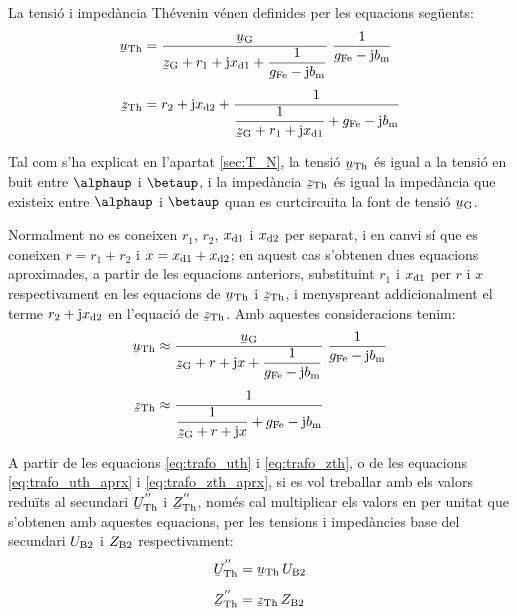 La tensió i impedància Thévenin vénen definides per les equacions
següents:
\begin{align}
    \cmplx{u}\ped{Th} &= \frac{\cmplx{u}\ped{G}}{\cmplx{z}\ped{G} + r_1 + \ju
    x\ped{d1} + \dfrac{1}{g\ped{Fe}-\ju b\ped{m}}} \;\frac{1}{g\ped{Fe}-\ju
    b\ped{m}} \label{eq:trafo_uth}\\[1ex]
    \cmplx{z}\ped{Th} &= r_2 + \ju x\ped{d2} + \frac{1}{\dfrac{1}{\cmplx{z}\ped{G} + r_1 +
    \ju x\ped{d1}} + g\ped{Fe}-\ju b\ped{m}}\label{eq:trafo_zth}
\end{align}

Tal com s'ha explicat en l'apartat \vref{sec:T_N}, la tensió
$\cmplx{u}\ped{Th}$ és igual a la tensió en buit entre $\alphaup$ i
$\betaup$, i la impedància $\cmplx{z}\ped{Th}$ és igual la impedància
que existeix entre $\alphaup$ i $\betaup$ quan es curtcircuita la font
de tensió $\cmplx{u}\ped{G}$.

Normalment no es coneixen $r_1$, $r_2$, $x_\mathrm{d1}$ i $x_\mathrm{d2}$ per separat, i
en canvi sí que es coneixen $r=r_1+r_2$ i $x=x_\mathrm{d1}+x_\mathrm{d2}$; en aquest
cas s'obtenen dues equacions aproximades, a partir de les equacions
anteriors, substituint $r_1$ i $x_\mathrm{d1}$ per $r$ i $x$ respectivament en
les equacions de $\cmplx{u}\ped{Th}$ i $\cmplx{z}\ped{Th}$, i
menyspreant addicionalment el terme $r_2 + \mathrm{j} x_\mathrm{d2}$ en l'equació
de $\cmplx{z}\ped{Th}$. Amb aquestes consideracions tenim:
\begin{align}
    \cmplx{u}\ped{Th} &\approx \frac{\cmplx{u}\ped{G}}{\cmplx{z}\ped{G} + r + \ju
    x + \dfrac{1}{g\ped{Fe}-\ju b\ped{m}}} \;\frac{1}{g\ped{Fe}-\ju
    b\ped{m}} \label{eq:trafo_uth_aprx}\\[1ex]
    \cmplx{z}\ped{Th} &\approx \frac{1}{\dfrac{1}{\cmplx{z}\ped{G} + r +
    \ju x} + g\ped{Fe}-\ju b\ped{m}}\label{eq:trafo_zth_aprx}
\end{align}

A partir de les equacions \eqref{eq:trafo_uth} i
\eqref{eq:trafo_zth}, o de les equacions \eqref{eq:trafo_uth_aprx} i
\eqref{eq:trafo_zth_aprx}, si es vol treballar amb els valors
reduïts al secundari $\cmplx{U}\ped{Th}^{''}$ i
$\cmplx{Z}\ped{Th}^{''}$, només cal multiplicar els valors en per unitat
que s'obtenen amb aquestes equacions, per les tensions i impedàncies
base del secundari $U_\mathrm{B2}$ i $Z_\mathrm{B2}$ respectivament:
\begin{align}
    \cmplx{U}\ped{Th}^{''} &= \cmplx{u}\ped{Th} \, U\ped{B2} \\[1ex]
    \cmplx{Z}\ped{Th}^{''} &= \cmplx{z}\ped{Th} \, Z\ped{B2}
\end{align}


